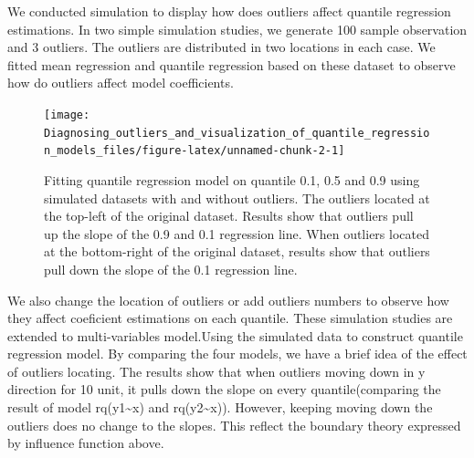 \documentclass[11pt,a4paper,]{article}
\theoremstyle{definition}
\theoremstyle{definition}
\theoremstyle{remark}
\begin{document}
We conducted simulation to display how does outliers affect quantile
regression estimations. In two simple simulation studies, we generate
100 sample observation and 3 outliers. The outliers are distributed in
two locations in each case. We fitted mean regression and quantile
regression based on these dataset to observe how do outliers affect
model coefficients.

\begin{figure}

{\centering \texttt{[image: Diagnosing\_outliers\_and\_visualization\_of\_quantile\_regression\_models\_files/figure-latex/unnamed-chunk-2-1]} 

}

\caption{Fitting quantile regression model on quantile 0.1, 0.5 and 0.9 using simulated datasets with and without outliers. The outliers located at the top-left of the original dataset. Results show that outliers pull up the slope of the 0.9 and 0.1 regression line. When outliers located at the bottom-right of the original dataset, results show that outliers pull down the slope of the 0.1 regression line.}\label{fig:unnamed-chunk-2}
\end{figure}

We also change the location of outliers or add outliers numbers to
observe how they affect coeficient estimations on each quantile. These
simulation studies are extended to multi-variables model.Using the
simulated data to construct quantile regression model. By comparing the
four models, we have a brief idea of the effect of outliers locating.
The results show that when outliers moving down in y direction for 10
unit, it pulls down the slope on every quantile(comparing the result of
model rq(y1\textasciitilde{}x) and rq(y2\textasciitilde{}x)). However,
keeping moving down the outliers does no change to the slopes. This
reflect the boundary theory expressed by influence function above.
\end{document}
